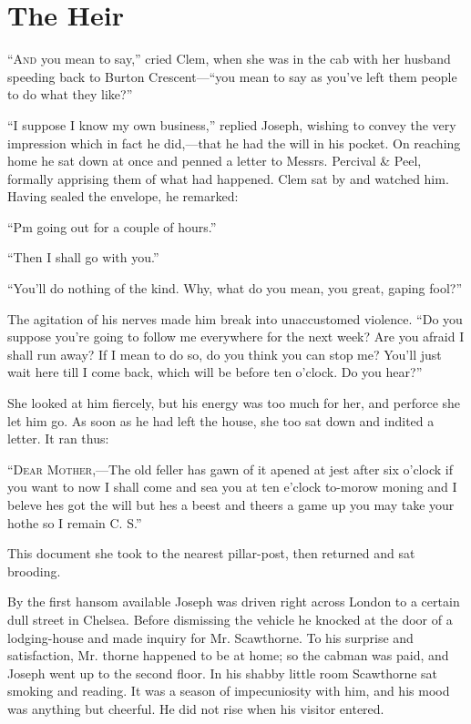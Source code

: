 \chapter{The Heir}

\textsc{``And} you mean to say,'' cried Clem, when she was in the cab
with her husband speeding back to Burton Crescent---``you mean to say as
you've left them people to do what they like?''

``I suppose I know my own business,'' replied Joseph, wishing to convey
the very impression which in fact he did,---that he had the will in his
pocket. On reaching home he sat down at once and penned a letter to
Messrs. Percival \& Peel, formally apprising them of what had happened.
Clem sat by and watched him. Having sealed the envelope, he remarked:

``Pm going out for a couple of hours.''

``Then I shall go with you.''

``You'll do nothing of the kind. Why, what do you mean, you great,
gaping fool?''

The agitation of his nerves made him break
{\protect\hypertarget{171}{}{}}into unaccustomed violence. ``Do you
suppose you're going to follow me everywhere for the next week? Are you
afraid I shall run away? If I mean to do so, do you think you can stop
me? You'll just wait here till I come back, which will be before ten
o'clock. Do you hear?''

She looked at him fiercely, but his energy was too much for her, and
perforce she let him go. As soon as he had left the house, she too sat
down and indited a letter. It ran thus:

``\textsc{Dear Mother},---The old feller has gawn of it apened at jest
after six o'clock if you want to now I shall come and sea you at ten
e'clock to-morow moning and I beleve hes got the will but hes a beest
and theers a game up you may take your hothe so I remain C. S.''

This document she took to the nearest pillar-post, then returned and sat
brooding.

By the first hansom available Joseph was driven right across London to a
certain dull street in Chelsea. Before dismissing the vehicle he knocked
at the door of a lodging-house and made inquiry for Mr. Scawthorne. To
his surprise and satisfaction, Mr. {\protect\hypertarget{172}{}{}}thorne
happened to be at home; so the cabman was paid, and Joseph went up to
the second floor. In his shabby little room Scawthorne sat smoking and
reading. It was a season of impecuniosity with him, and his mood was
anything but cheerful. He did not rise when his visitor entered.

